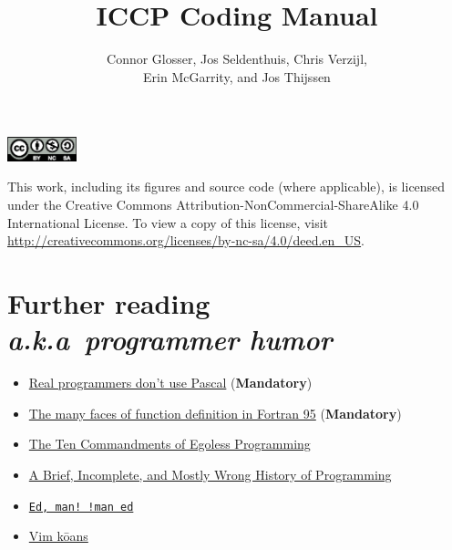 \documentclass[nofonts, notoc, debug]{tufte-book}
\title{ICCP Coding Manual}
\author{Connor Glosser, Jos Seldenthuis, Chris Verzijl, \\ 
  Erin McGarrity, and Jos Thijssen}
\newcommand{\Chapter}[2]{\chapter[#1]{#1\\[-1.5ex]\Large\itshape#2}}
\begin{document}
\maketitle

\pagestyle{empty}

\newpage
\null
\vfill
\begin{center}
  \includegraphics[width=0.15\textwidth]{figures/by-nc-sa.eps}
\end{center}
This work, including its figures and source code (where applicable), is
licensed under the Creative Commons Attribution-NonCommercial-ShareAlike 4.0
International License.  To view a copy of this license, visit
\url{http://creativecommons.org/licenses/by-nc-sa/4.0/deed.en_US}.

\pagestyle{fancy}

\tableofcontents


\mainmatter







\appendix




\backmatter
\Chapter{Further reading}{a.k.a\ programmer humor}
\begin{itemize}
  \item \href{http://www.pbm.com/~lindahl/real.programmers.html}{Real programmers don't use Pascal} (\textbf{Mandatory})
  \item \href{https://gist.github.com/alanbriolat/3135713#file-fortran_hell-f95}{The many faces of function definition in Fortran 95} (\textbf{Mandatory})
  \item \href{http://www.codinghorror.com/blog/2006/05/the-ten-commandments-of-egoless-programming.html}{The Ten Commandments of Egoless Programming}
  \item \href{http://james-iry.blogspot.com/2009/05/brief-incomplete-and-mostly-wrong.html}{A Brief, Incomplete, and Mostly Wrong History of Programming}
  \item \href{https://www.gnu.org/fun/jokes/ed-msg.html}{\texttt{Ed, man! !man ed}}
  \item \href{http://blog.sanctum.geek.nz/vim-koans/}{Vim k\={o}ans}
\end{itemize}

\printindex
\end{document}
